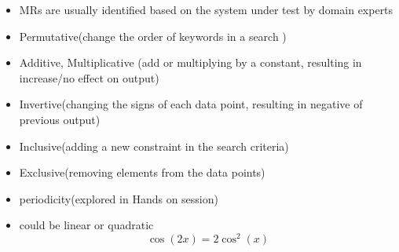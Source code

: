 \begin{frame}[fragile]
		\begin{itemize}
			\item MRs are usually identified based on the system under test by domain experts
			\item Permutative(change the order of keywords in a search )
			\item Additive, Multiplicative (add or multiplying by a constant, resulting in increase/no effect on output)
			\item Invertive(changing the signs of each data point, resulting in negative of previous output)
			\item Inclusive(adding a new constraint in the search criteria)
			\item Exclusive(removing elements from the data points)
			\item periodicity(explored in Hands on session)
			\item could be linear or quadratic $$ \cos{(2x)} = 2{\cos} ^2  (x)   $$
		\end{itemize}		
	
\end{frame}